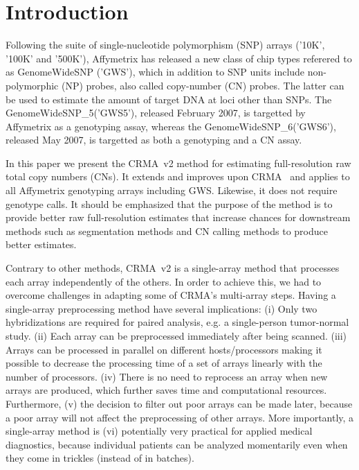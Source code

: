 \documentclass{bioinfo}
\newcommand{\GWS}{GWS\xspace}
\newcommand{\GWSFive}{GWS5\xspace}
\newcommand{\GWSSix}{GWS6\xspace}
\newcommand{\GWSFivef}{GenomeWideSNP\_5\xspace}
\newcommand{\GWSSixf}{GenomeWideSNP\_6\xspace}
\begin{document}
\section{Introduction}
\label{secBackground}
Following the suite of single-nucleotide polymorphism (SNP) arrays ('10K', '100K' and '500K'), Affymetrix has released a new class of chip types referered to as GenomeWideSNP ('GWS'), which in addition to SNP units include non-polymorphic (NP) probes, also called copy-number (CN) probes.  The latter can be used to estimate the amount of target DNA at loci other than SNPs.  The \GWSFivef ('\GWSFive'), released February 2007, is targetted by Affymetrix as a genotyping assay, whereas the \GWSSixf ('\GWSSix'), released May 2007, is targetted as both a genotyping and a CN assay.

In this paper we present the CRMA~v2 method for estimating full-resolution raw total copy numbers (CNs).  It extends and improves upon CRMA~\citep{BengtssonH_etal_2008a} and applies to all Affymetrix genotyping arrays including \GWS. Likewise, it does not require genotype calls.  
It should be emphasized that the purpose of the method is to provide better raw full-resolution estimates that increase chances for downstream methods such as segmentation methods and CN calling methods to produce better estimates.

Contrary to other methods, CRMA~v2 is a single-array method that processes each array independently of the others.  In order to achieve this, we had to overcome challenges in adapting some of CRMA's multi-array steps.
Having a single-array preprocessing method have several implications: (i) Only two hybridizations are required for paired analysis, e.g. a single-person tumor-normal study. (ii) Each array can be preprocessed immediately after being scanned.  (iii) Arrays can be processed in parallel on different hosts/processors making it possible to decrease the processing time of a set of arrays linearly with the number of processors.  (iv) There is no need to reprocess an array when new arrays are produced, which further saves time and computational resources.   Furthermore, (v) the decision to filter out poor arrays can be made later, because a poor array will not affect the preprocessing of other arrays. %
More importantly, a single-array method is (vi) potentially very practical for applied medical diagnostics, because individual patients can be analyzed momentarily even when they come in trickles (instead of in batches).
\end{document}
